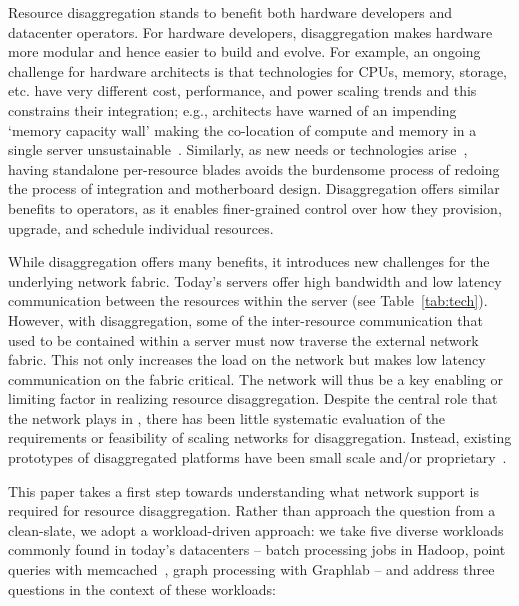 Resource disaggregation stands to benefit both hardware developers and datacenter operators. %
For hardware developers, disaggregation makes hardware more modular and hence 
easier to build and evolve. 
For example, an ongoing challenge for hardware architects is that technologies for CPUs, memory, storage, etc. have very different cost, performance, and power scaling trends and this constrains their integration; e.g., architects have warned of an impending `memory capacity wall' making the co-location of compute and memory in a single server unsustainable~\cite{ddcHwDesign1}. 
Similarly, as new needs or technologies arise~\cite{memristors,nvram,reg-ex-hardware,gpus}, having standalone per-resource blades avoids the burdensome process of redoing the process of integration and motherboard design.
Disaggregation offers similar benefits to operators, as it enables finer-grained control over how they  provision, upgrade, and schedule individual resources.

While disaggregation offers many benefits, it introduces new challenges for the underlying network fabric. Today's servers offer high bandwidth and low latency communication between the resources within the server (see Table~\ref{tab:tech}). However, with disaggregation, some of the inter-resource communication that used to be contained within a server must now traverse the external network fabric. This not only increases the load on the network but makes low latency communication on the fabric critical. The network will thus be a key enabling or limiting factor in realizing resource disaggregation. 
Despite the central role that the network plays in \dis, there has been little systematic evaluation of the requirements or feasibility of scaling networks for disaggregation. Instead, existing prototypes of disaggregated platforms have been small scale and/or proprietary~\cite{rsa, hptm, fdr, seamicro}. 

This paper takes a first step towards understanding what network support is required for resource disaggregation. Rather than approach the question from a clean-slate, we adopt a workload-driven approach: we take five diverse workloads commonly found in today's datacenters -- batch processing jobs in Hadoop, point queries with memcached~\cite{memcached}, graph processing with Graphlab -- and address three questions in the context of these workloads: 


